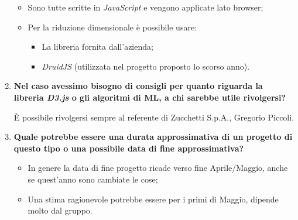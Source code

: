 \documentclass[11pt]{article}
\begin{document}
\begin{enumerate}
			\begin{itemize}
				\item Sono tutte scritte in \textit{JavaScript} e vengono applicate lato browser;
				\item Per la riduzione dimensionale è possibile usare:
				\begin{itemize}
					\item La libreria fornita dall'azienda;
					\item \textit{DruidJS} (utilizzata nel progetto proposto lo scorso anno).
				\end{itemize}
			\end{itemize}
			
			\bigskip
			
			\item \textbf{Nel caso avessimo bisogno di consigli per quanto riguarda la libreria \textit{D3.js} o gli
			algoritmi di ML, a chi sarebbe utile rivolgersi?}
			
			\medskip
			
			È possibile rivolgersi sempre al referente di Zucchetti S.p.A., Gregorio Piccoli.
			
			\bigskip
			
			\item \textbf{Quale potrebbe essere una durata approssimativa di un progetto di questo tipo o una possibile data di
			fine approssimativa? }
			
			\medskip
			
			\begin{itemize}
				\item In genere la data di fine progetto ricade verso fine Aprile/Maggio, anche se quest'anno sono cambiate le cose;
				\item Una stima ragionevole potrebbe essere per i primi di Maggio, dipende molto dal gruppo.
			\end{itemize}

		\end{enumerate}
		
\end{document}
